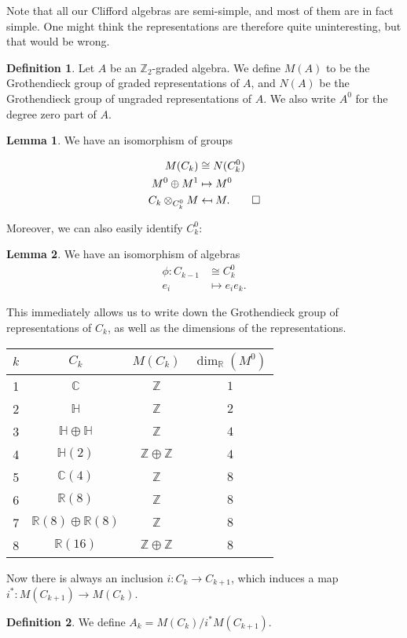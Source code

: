 \documentclass{shortart}
\theoremstyle{definition}
\newtheorem*{defi}{Definition}
\newtheorem*{lemma}{Lemma}
\newcommand\R{\mathbb{R}}
\newcommand\C{\mathbb{C}}
\renewcommand\H{\mathbb{H}}
\newcommand\Z{\mathbb{Z}}
\newcommand\leftmapsto{\mathrel{\reflectbox{\ensuremath{\mapsto}}}}
\begin{document}
Note that all our Clifford algebras are semi-simple, and most of them are in fact simple. One might think the representations are therefore quite uninteresting, but that would be wrong.

\begin{defi}
  Let $A$ be an $\Z_2$-graded algebra. We define $M(A)$ to be the Grothendieck group of graded representations of $A$, and $N(A)$ be the Grothendieck group of ungraded representations of $A$. We also write $A^0$ for the degree zero part of $A$.
\end{defi}

\begin{lemma}\pushQED{\qed}
  We have an isomorphism of groups
  \begin{useimager}
    \begin{align*}
      M(C_k) &\cong N(C_k^0)\\
      M^0 \oplus M^1 &\mapsto M^0\\
      C_k \otimes_{C_k^0} M &\leftmapsto M.\qedhere
    \end{align*}
  \end{useimager}\ifplastex\fakeqed\fi
\end{lemma}

Moreover, we can also easily identify $C_k^0$:

\begin{lemma}
  We have an isomorphism of algebras
  \begin{align*}
    \phi: C_{k - 1} &\cong C_k^0\\
    e_i &\mapsto e_i e_k.
  \end{align*}
\end{lemma}

This immediately allows us to write down the Grothendieck group of representations of $C_k$, as well as the dimensions of the representations.
\begin{center}
  \begin{tabular}{cccc}
    \toprule
    $k$ & $C_k$ & $M(C_k)$ & $\dim_\R (M^0)$\\
    \midrule
    1 & $\C$ & $\Z$ & $1$ \\
    2 & $\H$ & $\Z$ & $2$ \\
    3 & $\H \oplus \H$ & $\Z$ & $4$ \\
    4 & $\H(2)$ & $\Z \oplus \Z$ & $4$\\
    5 & $\C(4)$ & $\Z$ & $8$\\
    6 & $\R(8)$ & $\Z$ & $8$\\
    7 & $\R(8) \oplus \R(8)$ & $\Z$ & $8$\\
    8 & $\R(16)$ & $\Z \oplus \Z$ & $8$\\
    \bottomrule
  \end{tabular}
\end{center}
Now there is always an inclusion $i: C_k \to C_{k + 1}$, which induces a map $i^*: M(C_{k + 1}) \to M(C_k)$.
\begin{defi}
  We define $A_k = M(C_k) / i^* M(C_{k + 1})$.
\end{defi}
\end{document}
